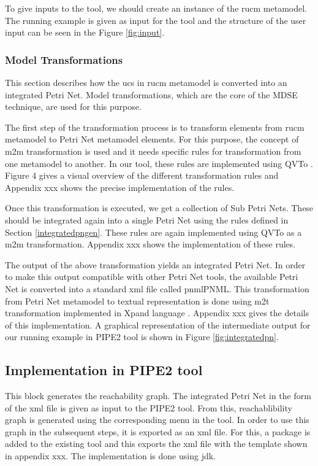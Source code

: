 To give inputs to the tool, we should create an instance of the \gls{rucm} metamodel. The running example is given as input for the tool and the structure of the user input can be seen in the Figure \ref{fig:input}.

\subsubsection{Model Transformations}
This section describes how the \gls{ucs} in \gls{rucm} metamodel is converted into an integrated Petri Net. Model transformations, which are the core of the MDSE technique, are used for this purpose.

The first step of the transformation process is to transform elements from \gls{rucm} metamodel to Petri Net metamodel elements. For this purpose, the concept of \gls{m2m} transformation is used and it needs specific rules for transformation from one metamodel to another.  In our tool, these rules are implemented using QVTo \cite{eclipseqvt}. Figure 4 gives a visual overview of the different transformation rules and Appendix xxx shows the precise implementation of the rules. 

Once this transformation is executed, we get a collection of Sub Petri Nets. These should be integrated again into a single Petri Net using the rules defined in Section \ref{integratedpngen}. These rules are again implemented using QVTo as a \gls{m2m} transformation. Appendix xxx shows the implementation of these rules.

The output of the above transformation yields an integrated Petri Net. In order to make this output compatible with other Petri Net tools, the available Petri Net is converted into a standard xml file called \gls{pnml}PNML. This transformation from Petri Net metamodel to textual representation is done using \gls{m2t} transformation implemented in Xpand language \cite{eclipsem2t}. Appendix xxx gives the details of this implementation. A graphical representation of the intermediate output for our running example in PIPE2 tool is shown in Figure \ref{fig:integratedpn}.

\subsection{Implementation in PIPE2 tool}
This block generates the reachability graph. The integrated Petri Net in the form of the xml file is given as input to the PIPE2 tool. From this, reachablibility graph is generated using the corresponding menu in the tool. In order to use this graph in the subsequent steps, it is exported as an xml file. For this, a package is added to the existing tool and this exports the xml file with the template shown in appendix xxx. The implementation is done using \gls{jdk}.

